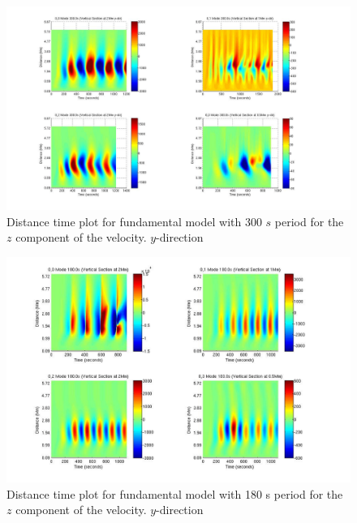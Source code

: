 \documentclass[authoryear,final,1p]{elsarticle}
\begin{document}

\begin{figure}[h]
\includegraphics[scale=0.3]{imagesn/dt_300_vert_y.jpg}
\caption{Distance time plot for fundamental model with 300 $s$ period for the $z$ component of the velocity. $y$-direction }
\end{figure}


\begin{figure}[h]
\includegraphics[scale=0.3]{imagesn/dt_180_vert_y.jpg}
\caption{Distance time plot for fundamental model with 180 s period for the $z$ component of the velocity.  $y$-direction}
\end{figure}
\end{document}
